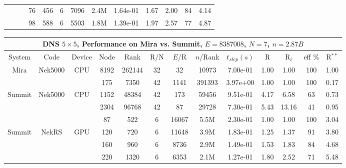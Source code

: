 \begin{table*}[!t]
\begin{center}
\begin{tabular}{|c|c|c|c|c|c|c|c|c|c|c|c|c|}
         &       &    &   76  & 456   &  6 &  7096 &  2.4M &  1.64e-01 & 1.67 &2.00 &  84 &  4.14 \\
         &       &    &   98  & 588   &  6 &  5503 &  1.8M &  1.39e-01 & 1.97 &2.57 &  77 &  4.87 \\
  \hline
  \end{tabular}
  \end{center}
  \begin{center} \begin{tabular}{|c|c|c|c|c|c|c|c|c|c|c|c|c|}
  \hline
  \multicolumn{13}{|c|}{{\bf DNS $5\times 5$, Performance on Mira vs. Summit, $E=8387008$, $N=7$, $n=2.87B$}} \\ %
  \hline
  \hline
  System & Code & Device & Node & Rank & R/N & $E$/R & $n$/Rank &  $t_{step} (s) $ &  R  & R$_{i}$ & eff \% & R$^{**}$ \\
  \hline
  \hline
  Mira    & Nek5000& CPU&    8192 &262144 & 32 &  32   & 10973   &7.00e-01 & 1.00 & 1.00 & 100 & 1.00 \\
  \hline
  \hline
          &        &    &   175   & 7350   & 42 &  1141 & 391393  &3.97e+00 & 1.00 & 1.00  & 100 &  0.17 \\
   Summit & Nek5000& CPU&   1152  & 48384  & 42 &  173  & 59456   &9.51e-01 & 4.17 & 6.58  & 63 &   0.73 \\
          &        &    &   2304  & 96768  & 42 &  87   & 29728   &7.30e-01 & 5.43 & 13.16 & 41 &  0.95 \\
  \hline
  \hline
          &        &    &  87   &  522   & 6 &  16067&  5.5M &  2.30e-01 & 1.00 & 1.00 & 100 & 3.04  \\
  Summit  & NekRS  & GPU& 120   &  720   & 6 &  11648&  3.9M &  1.83e-01 & 1.25 & 1.37 & 91  & 3.80  \\
          &        &    & 160   &  960   & 6 &  8736 &  2.9M &  1.49e-01 & 1.53 & 1.83 & 84  & 4.68  \\
          &        &    & 220   & 1320   & 6 &  6353 &  2.1M &  1.27e-01 & 1.80 & 2.52 & 71  & 5.48  \\
  \hline
  \end{tabular}
  \end{center}
\caption{\label{mira-table}
Performance on Mira (Nek5000) vs. Summit CPU (Nek5000) and GPU (NekRS).
Timings are in seconds for the wall time per step, $t_{step}$.  R$^{**}$, the
ratio of $t_{step}$ of 8192 nodes on Mira to all others on Summit CPU and GPUs.
(top) {\bf Spacer-Grid}:
400 timesteps over simulation time interval [138.0431, 138.0671]
with $\dt$= 6.00e-05 (CFL=1.74) at $Re_D=14000$.
CHAR=T (1 substep).
(bottom) {\bf DNS $5\times5$}:
400 timesteps over simulation time interval [59.71, 59.78] with $\dt$= 1.9e-04 (CFL=0.32) at $Re_D=19000$.
BDF2+EXT2.
}
\end{table*}
